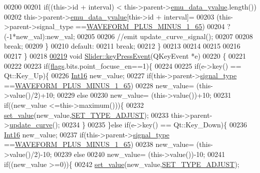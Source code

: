 \begin{DoxyCode}
00200 
00201         \textcolor{keywordflow}{if}((this->\textcolor{keywordtype}{id} + interval) < this->parent->\hyperlink{a00004_ad922d05d1e988d84f404c115fe909f72}{emu\_data\_yvalue}.length())
00202         this->parent->\hyperlink{a00004_ad922d05d1e988d84f404c115fe909f72}{emu\_data\_yvalue}[this->id + interval]=
00203         (this->parent->signal\_type ==\hyperlink{a00034_a0923d3b365a36e1e8c401cec964aa36f}{WAVEFORM\_PLUS\_MINUS\_1\_65})
00204         ?(-1*new\_val):new\_val;
00205 
00206         \textcolor{comment}{//emit update\_curve\_signal();}
00207 
00208     \textcolor{keywordflow}{break};
00209     \}
00210     \textcolor{keywordflow}{default}:
00211         \textcolor{keywordflow}{break};
00212     \}
00213 
00214 
00215 
00216 
00217 \}
00218 
\hypertarget{a00046_source_l00219}{}\hyperlink{a00024_ab803f71d290c06c574e6d46be42e779e}{00219} \textcolor{keywordtype}{void} \hyperlink{a00024_ab803f71d290c06c574e6d46be42e779e}{Slider::keyPressEvent}(QKeyEvent *e)
00220 \{
00221 
00222 
00223     \textcolor{keywordflow}{if}(\hyperlink{a00024_ade6449558d429b66e5ed1381bc9b9060}{flags}.bits.point\_focuse\_en==1)\{
00224 
00225     \textcolor{keywordflow}{if}(e->key() == Qt::Key\_Up)\{
00226         \hyperlink{a00001_a3985266aecb120f269789241c170850c}{Int16} new\_value;
00227         \textcolor{keywordflow}{if}(this->parent->\hyperlink{a00004_a070edaec5aee6ba1f5a6866bc32c8ce4}{signal\_type} ==\hyperlink{a00034_a0923d3b365a36e1e8c401cec964aa36f}{WAVEFORM\_PLUS\_MINUS\_1\_65})
00228         new\_value= (this->value()/2)+10;
00229         \textcolor{keywordflow}{else}
00230         new\_value= (this->value())+10;
00231         \textcolor{keywordflow}{if}((new\_value <=this->maximum()))\{
00232             \hyperlink{a00024_ae3010d3de02715db2f443560d7d2a27b}{set\_value}(new\_value,\hyperlink{a00034_a16b6b7b5ad68ec0dd62a3c9e97f88adb}{SET\_TYPE\_ADJUST});
00233             this->parent->\hyperlink{a00004_a15cbcf5f0a17281468800f47898f60c1}{update\_curve}();
00234         \}
00235     \}\textcolor{keywordflow}{else} \textcolor{keywordflow}{if}(e->key() == Qt::Key\_Down)\{
00236         \hyperlink{a00001_a3985266aecb120f269789241c170850c}{Int16} new\_value;
00237         \textcolor{keywordflow}{if}(this->parent->\hyperlink{a00004_a070edaec5aee6ba1f5a6866bc32c8ce4}{signal\_type} ==\hyperlink{a00034_a0923d3b365a36e1e8c401cec964aa36f}{WAVEFORM\_PLUS\_MINUS\_1\_65})
00238         new\_value= (this->value()/2)-10;
00239         \textcolor{keywordflow}{else}
00240         new\_value= (this->value())-10;
00241         \textcolor{keywordflow}{if}((new\_value >=0))\{
00242             \hyperlink{a00024_ae3010d3de02715db2f443560d7d2a27b}{set\_value}(new\_value,\hyperlink{a00034_a16b6b7b5ad68ec0dd62a3c9e97f88adb}{SET\_TYPE\_ADJUST});

\end{DoxyCode}
